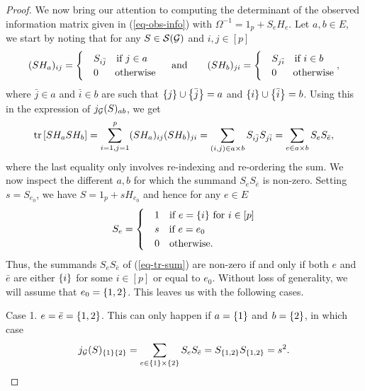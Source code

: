 \begin{proof}
    We now bring our attention to computing the determinant of the observed information matrix given in (\ref{eq-obs-info}) with $\Omega^{-1} = 1_p + S_e H_e$. Let $a, b \in E$, we start by noting that for any $S \in {\mathcal{S}}({\mathcal{G}})$ and $i, j \in [p]$
    \begin{equation*}
        (SH_a)_{ij} = \begin{cases}
            & S_{i \bar j}\ \ \t{ if } j \in a\\
            &0\ \ \ \ \  \t{otherwise}
        \end{cases}
        \ \ \ \t{ and }\ \ \ \ \ 
        (SH_b)_{ji} = \begin{cases}
            & S_{j \bar i}\ \ \t{ if } i \in b\\
            &0\ \ \ \ \  \t{otherwise}
        \end{cases},
    \end{equation*}
    where $\bar j \in a$ and $\bar i \in b$ are such that ${\left\{j\right\}} \cup {\left\{\bar j\right\}} = a$ and ${\left\{i\right\}} \cup {\left\{\bar i\right\}} = b$. Using this in the expression of $j_{\mathcal{G}}(S)_{ab}$, we get
    \begin{equation} \label{eq-tr-sum}
        {\textrm{tr}\left[SH_aSH_b\right]} = \sum_{i=1, j=1}^p (SH_a)_{ij}(SH_b)_{ji} = \sum_{(i, j) \in a \times b} S_{i \bar j} S_{j \bar i} = \sum_{e \in a \times b} S_e S_{\bar e},
    \end{equation}
    where the last equality only involves re-indexing and re-ordering the sum. We now inspect the different $a, b$ for which the summand $S_eS_{\bar e}$ is non-zero. Setting $s = S_{e_0}$, we have $S = 1_p + s H_{e_0}$ and hence for any $e \in E$
    \begin{equation*}
        S_e = \begin{cases}
            &1\ \ {\textrm{ if }} e = {\left\{ i \right\}} {\textrm{ for }} i \in [p]\\
            &s\ \ {\textrm{ if }} e = e_0\\
            &0\ \ {\textrm{ otherwise}}.
        \end{cases}
    \end{equation*}
    Thus, the summands $S_e S_{\bar e}$ of (\ref{eq-tr-sum}) are non-zero if and only if both $e$ and $\bar e$ are either ${\left\{i\right\}}$ for some $i \in [p]$ or equal to $e_0$. Without loss of generality, we will assume that $e_0 = {\left\{1, 2\right\}}$. This leaves us with the following cases. 

    Case 1. $e = \bar e = {\left\{1, 2\right\}}$. This can only happen if $a = {\left\{1\right\}}$ and $b = {\left\{2\right\}}$, in which case
    \begin{equation*}
        j_{\mathcal{G}}(S)_{{\left\{1\right\}} {\left\{2\right\}}} = \sum_{e \in {\left\{1\right\}} \times {\left\{2\right\}}} S_e S_{\bar e} = S_{{\left\{1, 2\right\}}}S_{{\left\{1, 2\right\}}} = s^2.
    \end{equation*}


\end{proof}

